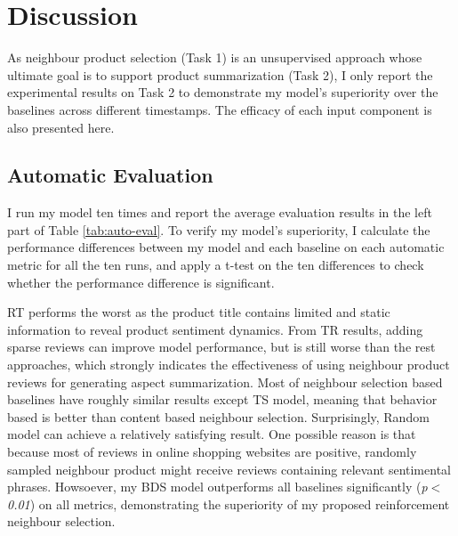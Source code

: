 \section{Discussion}
As neighbour product selection (Task 1) is an unsupervised approach whose ultimate goal is to support product summarization (Task 2),  I only report the experimental results on Task 2 to demonstrate my model's superiority over the baselines across different timestamps. The efficacy of each input component is also presented here.

\subsection{Automatic Evaluation}

I run my model ten times and report the average evaluation results in the left part of Table \ref{tab:auto-eval}. To verify my model's superiority, I calculate the performance differences between my model and each baseline on each automatic metric for all the ten runs, and apply a t-test on the ten differences to check whether the performance difference is significant. 

RT performs the worst as the product title contains limited and static information to reveal product sentiment dynamics. From TR results, adding sparse reviews can improve model performance, but is still worse than the rest approaches, which strongly indicates the effectiveness of using neighbour product reviews for generating aspect summarization. Most of neighbour selection based baselines have roughly similar results except TS model, meaning that behavior based is better than content based neighbour selection. Surprisingly, Random model can achieve a relatively satisfying result. One possible reason is that because most of reviews in online shopping websites are positive, randomly sampled neighbour product might receive reviews containing relevant sentimental phrases. Howsoever, my BDS model outperforms all baselines significantly (\textit{p$<$0.01}) on all metrics, demonstrating the superiority of my proposed reinforcement neighbour selection.
 

